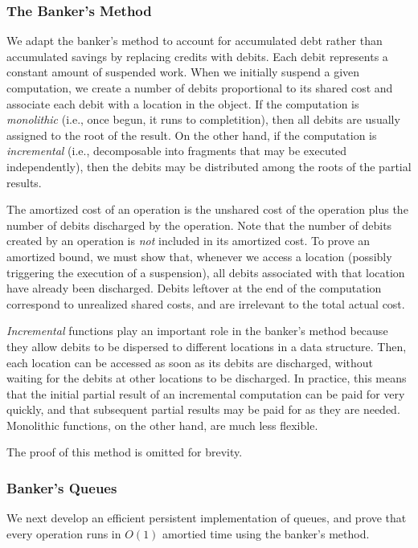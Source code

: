 \documentclass[12pt, a4paper]{article} %
\begin{document}
\subsubsection{The Banker's Method}%
\label{ssub:The Banker's Method}

We adapt the banker's method to account for accumulated debt rather than accumulated savings by replacing credits with debits. Each debit represents a constant amount of suspended work. When we initially suspend a given computation, we create a number of debits proportional to its shared cost and associate each debit with a location in the object. If the computation is \textit{monolithic} (i.e., once begun, it runs to completition), then all debits are usually assigned to the root of the result. On the other hand, if the computation is \textit{incremental} (i.e., decomposable into fragments that may be executed independently), then the debits may be distributed among the roots of the partial results.

The amortized cost of an operation is the unshared cost of the operation plus the number of debits discharged by the operation. Note that the number of debits created by an operation is \textit{not} included in its amortized cost. To prove an amortized bound, we must show that, whenever we access a location (possibly triggering the execution of a suspension), all debits associated with that location have already been discharged. Debits leftover at the end of the computation correspond to unrealized shared costs, and are irrelevant to the total actual cost.

\textit{Incremental} functions play an important role in the banker's method because they allow debits to be dispersed to different locations in a data structure. Then, each location can be accessed as soon as its debits are discharged, without waiting for the debits at other locations to be discharged. In practice, this means that the initial partial result of an incremental computation can be paid for very quickly, and that subsequent partial results may be paid for as they are needed. Monolithic functions, on the other hand, are much less flexible.

The proof of this method is omitted for brevity.

\subsubsection{Banker's Queues}%
\label{ssub:Banker's Queues}

We next develop an efficient persistent implementation of queues, and prove that every operation runs in $O(1)$ amortied time using the banker's method.
\end{document}
